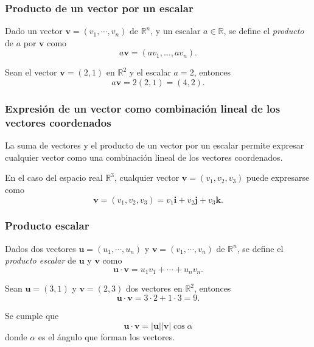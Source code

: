 \begin{frame}
	\frametitle{Producto de un vector por un escalar}
	\begin{definicion}
		Dado un vector $\mathbf{v}=(v_1,\cdots,v_n)$ de $\mathbb{R}^n$, y un escalar $a\in \mathbb{R}$, se define el
		\emph{producto} de $a$ por $\mathbf{v}$ como
		\[
			a\mathbf{v} = (av_1,\ldots, av_n).
		\]
	\end{definicion}
	Sean el vector $\mathbf{v}=(2,1)$ en $\mathbb{R}^2$ y el escalar $a=2$, entonces
	\[
		a\mathbf{v} = 2(2,1) = (4,2).
	\]
	
	\begin{center}
		\scalebox{0.8}{}
	\end{center}
\end{frame}  


\begin{frame}
	\frametitle{Expresión de un vector como combinación lineal de los vectores coordenados}
	La suma de vectores y el producto de un vector por un escalar permite expresar cualquier vector como una combinación lineal de los vectores coordenados.
	
	En el caso del espacio real $\mathbb{R}^3$, cualquier vector $\mathbf{v}=(v_1,v_2,v_3)$ puede expresarse como   
	\[
		\mathbf{v}=(v_1,v_2,v_3) = v_1\mathbf{i}+v_2\mathbf{j}+v_3\mathbf{k}.
	\]
	
	\begin{center}
		\scalebox{0.8}{}
	\end{center}
\end{frame} 


\begin{frame}
	\frametitle{Producto escalar}
	\begin{definicion}
		Dados dos vectores $\mathbf{u}=(u_1,\cdots,u_n)$ y $\mathbf{v}=(v_1,\cdots,v_n)$ de $\mathbb{R}^n$, se define el
		\emph{producto escalar} de $\mathbf{u}$ y $\mathbf{v}$ como
		\[
			\mathbf{u}\cdot \mathbf{v} = u_1v_1 + \cdots + u_nv_n.
		\]
	\end{definicion}
	Sean $\mathbf{u}=(3,1)$ y $\mathbf{v}=(2,3)$ dos vectores en $\mathbb{R}^2$, entonces
	\[
		\mathbf{u}\cdot\mathbf{v} = 3\cdot 2 +1\cdot 3 = 9.
	\]
	
	Se cumple que
	\[
		\mathbf{u}\cdot\mathbf{v} =  |\mathbf{u}||\mathbf{v}|\cos\alpha
	\]
	donde $\alpha$ es el ángulo que forman los vectores.
\end{frame} 


